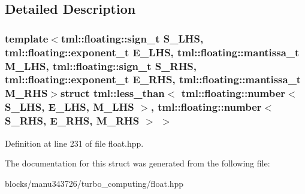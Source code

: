 \subsection{Detailed Description}
\subsubsection*{template$<$tml\+::floating\+::sign\+\_\+t S\+\_\+\+L\+H\+S, tml\+::floating\+::exponent\+\_\+t E\+\_\+\+L\+H\+S, tml\+::floating\+::mantissa\+\_\+t M\+\_\+\+L\+H\+S, tml\+::floating\+::sign\+\_\+t S\+\_\+\+R\+H\+S, tml\+::floating\+::exponent\+\_\+t E\+\_\+\+R\+H\+S, tml\+::floating\+::mantissa\+\_\+t M\+\_\+\+R\+H\+S$>$struct tml\+::less\+\_\+than$<$ tml\+::floating\+::number$<$ S\+\_\+\+L\+H\+S, E\+\_\+\+L\+H\+S, M\+\_\+\+L\+H\+S $>$, tml\+::floating\+::number$<$ S\+\_\+\+R\+H\+S, E\+\_\+\+R\+H\+S, M\+\_\+\+R\+H\+S $>$ $>$}



Definition at line 231 of file float.\+hpp.



The documentation for this struct was generated from the following file\+:\begin{DoxyCompactItemize}
\item 
blocks/manu343726/turbo\+\_\+computing/float.\+hpp\end{DoxyCompactItemize}

